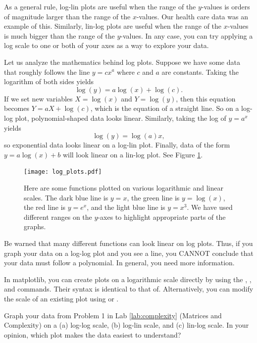 As a general rule, log-lin plots are useful when the range of the $y$-values is orders of magnitude larger than the range of the $x$-values. 
Our health care data was an example of this. 
Similarly, lin-log plots are useful when the range of the $x$-values is much bigger than the range of the $y$-values. 
In any case, you can try applying a log scale to one or both of your axes as a way to explore your data.

Let us analyze the mathematics behind log plots. 
Suppose we have some data that roughly follows the line $y=cx^a$ where $c$ and $a$ are constants. 
Taking the logarithm of both sides yields
\[
\log(y) = a\log(x) + \log(c).
\]
If we set new variables $X = \log(x)$ and $Y = \log(y)$, then this equation becomes $Y = aX + \log(c)$, which is the equation of a straight line. 
So  on a log-log plot, polynomial-shaped data looks linear. 
Similarly, taking the log of $y = a^x$ yields
\[
\log(y) = \log(a)x,
\]
so exponential data looks linear on a log-lin plot. 
Finally, data of the form $y = a\log(x)+b$ will look linear on a lin-log plot. 
See Figure \ref{fig:log_plots}.

\begin{figure}
\centering
\texttt{[image: log\_plots.pdf]}
\caption{Here are some functions plotted on various logarithmic and linear scales. 
The dark blue line is $y=x$, the green line is $y=\log(x)$, the red line is $y=e^x$, and the light blue line is $y=x^3$. 
We have used different ranges on the $y$-axes to highlight appropriate parts of the graphs.}
\label{fig:log_plots}
\end{figure}

Be warned that many different functions can look linear on log plots. 
Thus, if you graph your data on a log-log plot and you see a line, you CANNOT conclude that your data must follow a polynomial. 
In general, you need more information.

In matplotlib, you can create plots on a logarithmic scale directly by using the , , and  commands. 
Their syntax is identical to that of. 
Alternatively, you can modify the scale of an existing plot using  or .


\begin{problem}
Graph your data from Problem 1 in Lab \ref{lab:complexity} (Matrices and Complexity) on a (a) log-log scale, (b) log-lin scale, and (c) lin-log scale. 
In your opinion, which plot makes the data easiest to understand?
\end{problem}




